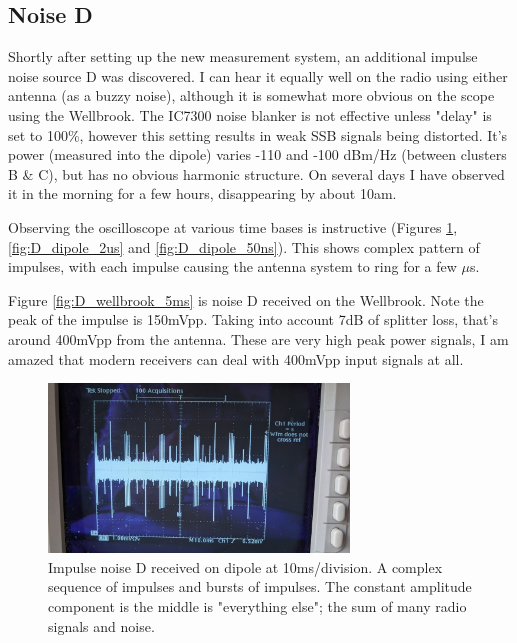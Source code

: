 \documentclass{article}
\begin{document}
\subsection{Noise D}

Shortly after setting up the new measurement system, an additional impulse noise source D was discovered.  I can hear it equally well on the radio using either antenna (as a buzzy noise), although it is somewhat more obvious on the scope using the Wellbrook.  The IC7300 noise blanker is not effective unless "delay" is set to 100\%, however this setting results in weak SSB signals being distorted. It's power (measured into the dipole) varies -110 and -100 dBm/Hz (between clusters B \& C), but has no obvious harmonic structure. On several days I have observed it in the morning for a few hours, disappearing by about 10am.

Observing the oscilloscope at various time bases is instructive (Figures \ref{fig:D_dipole_10ms}, \ref{fig:D_dipole_2us} and \ref{fig:D_dipole_50ns}).  This shows complex pattern of impulses, with each impulse causing the antenna system to ring for a few $\mu$s.

Figure \ref{fig:D_wellbrook_5ms} is noise D received on the Wellbrook. Note the peak of the impulse is 150mVpp.  Taking into account 7dB of splitter loss, that's around 400mVpp from the antenna.  These are very high peak power signals, I am amazed that modern receivers can deal with 400mVpp input signals at all.

\begin{figure}[h]
\caption{Impulse noise D received on dipole at 10ms/division.  A complex sequence of impulses and bursts of impulses.  The constant amplitude component is the middle is "everything else"; the sum of many radio signals and noise.}
\label{fig:D_dipole_10ms}
\begin{center}
\includegraphics[width=8cm]{D_dipole_10ms.jpg}
\end{center}
\end{figure}
\end{document}
